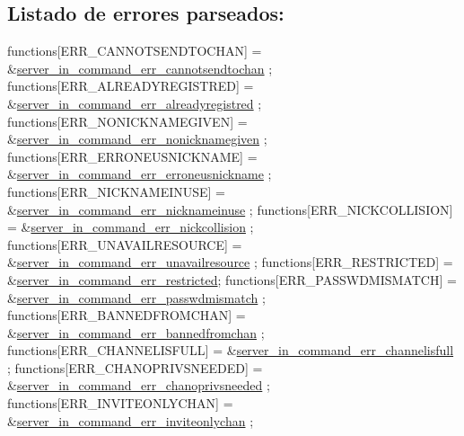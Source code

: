 \subsection*{Listado de errores parseados\+:}


\begin{DoxyCode}
functions[ERR\_CANNOTSENDTOCHAN]       = &\hyperlink{G-2313-06-P2__client__err__handlers_8h_aee5973ae831d1c7c63b1a62b59f561c2}{server\_in\_command\_err\_cannotsendtochan}
      ;
functions[ERR\_ALREADYREGISTRED]       = &\hyperlink{G-2313-06-P2__client__err__handlers_8h_a14bfb17eb95d0f2bef1869aa2ebf520c}{server\_in\_command\_err\_alreadyregistred}
      ;
functions[ERR\_NONICKNAMEGIVEN]        = &\hyperlink{G-2313-06-P2__client__err__handlers_8h_aaa9cfb1b5050bd1218c227d8d0a041fe}{server\_in\_command\_err\_nonicknamegiven}
      ;
functions[ERR\_ERRONEUSNICKNAME]       = &\hyperlink{G-2313-06-P2__client__err__handlers_8h_abeb8ead21ebba982eb59f161eda735cb}{server\_in\_command\_err\_erroneusnickname}
      ;
functions[ERR\_NICKNAMEINUSE]          = &\hyperlink{G-2313-06-P2__client__err__handlers_8h_ab6d8f2d05566bf6ee9dfcfc4a20f5d23}{server\_in\_command\_err\_nicknameinuse}
      ;
functions[ERR\_NICKCOLLISION]          = &\hyperlink{G-2313-06-P2__client__err__handlers_8h_a4af95b292b293c08c0989b4e7334c7eb}{server\_in\_command\_err\_nickcollision}
      ;
functions[ERR\_UNAVAILRESOURCE]        = &\hyperlink{G-2313-06-P2__client__err__handlers_8h_ae4fcb567dc7685f5d7a4abbc7c6506b4}{server\_in\_command\_err\_unavailresource}
      ;
functions[ERR\_RESTRICTED]             = &\hyperlink{G-2313-06-P2__client__err__handlers_8h_ada432444f58d5effbb05fd558a8ce289}{server\_in\_command\_err\_restricted};
functions[ERR\_PASSWDMISMATCH]         = &\hyperlink{G-2313-06-P2__client__err__handlers_8h_a548a7ad35236521dca4b829e466f3379}{server\_in\_command\_err\_passwdmismatch}
      ;
functions[ERR\_BANNEDFROMCHAN]         = &\hyperlink{G-2313-06-P2__client__err__handlers_8h_a0e4059ef132eaac2218fdd89b20ca852}{server\_in\_command\_err\_bannedfromchan}
      ;
functions[ERR\_CHANNELISFULL]          = &\hyperlink{G-2313-06-P2__client__err__handlers_8h_a05db0aa32f2ec2925cba3b952435bf59}{server\_in\_command\_err\_channelisfull}
      ;
functions[ERR\_CHANOPRIVSNEEDED]       = &\hyperlink{G-2313-06-P2__client__err__handlers_8h_a9fcb3f66fbcc994c7a78b36ebc0fe63d}{server\_in\_command\_err\_chanoprivsneeded}
      ;
functions[ERR\_INVITEONLYCHAN]         = &\hyperlink{G-2313-06-P2__client__err__handlers_8h_ae5512c3dd8e1584fd8bafc4f5dd15d8c}{server\_in\_command\_err\_inviteonlychan}
      ;

\end{DoxyCode}
